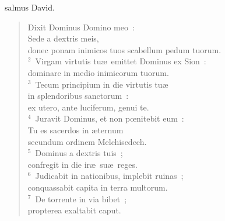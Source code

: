 \bchapter
{}salmus David. \begin{flushleft}\begin{verse}\vspace{6pt}Dixit Dominus Domino meo~:\\ Sede a dextris meis,\\ donec ponam inimicos tuos scabellum pedum tuorum.\\
${}^{2}$~Virgam virtutis tu\ae\ emittet Dominus ex Sion~:\\ dominare in medio inimicorum tuorum.\\
${}^{3}$~Tecum principium in die virtutis tu\ae \\ in splendoribus sanctorum~:\\ ex utero, ante luciferum, genui te.\\
${}^{4}$~Juravit Dominus, et non pœnitebit eum~:\\ Tu es sacerdos in \ae ternum\\ secundum ordinem Melchisedech.\\
${}^{5}$~Dominus a dextris tuis~;\\ confregit in die ir\ae\ su\ae\ reges.\\
${}^{6}$~Judicabit in nationibus, implebit ruinas~;\\ conquassabit capita in terra multorum.\\
${}^{7}$~De torrente in via bibet~;\\ propterea exaltabit caput.\end{verse}\end{flushleft}



